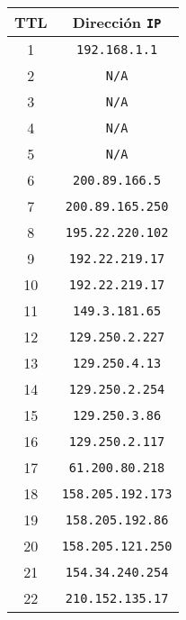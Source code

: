 \renewcommand{\arraystretch}{1.5}
\begin{tabular}{| c | c |}
    \hline
    TTL & Dirección \texttt{IP} \\
    \hline
    1 & \texttt{192.168.1.1} \\
    2 & \texttt{N/A} \\
    3 & \texttt{N/A} \\
    4 & \texttt{N/A} \\
    5 & \texttt{N/A} \\
    6 & \texttt{200.89.166.5} \\
    7 & \texttt{200.89.165.250} \\
    8 & \texttt{195.22.220.102} \\
    9 & \texttt{192.22.219.17} \\
    10 & \texttt{192.22.219.17} \\
    11 & \texttt{149.3.181.65} \\
    12 & \texttt{129.250.2.227} \\
    13 & \texttt{129.250.4.13} \\
    14 & \texttt{129.250.2.254} \\
    15 & \texttt{129.250.3.86} \\
    16 & \texttt{129.250.2.117} \\
    17 & \texttt{61.200.80.218} \\
    18 & \texttt{158.205.192.173} \\
    19 & \texttt{158.205.192.86} \\
    20 & \texttt{158.205.121.250} \\
    21 & \texttt{154.34.240.254} \\
    22 & \texttt{210.152.135.17} \\
    \hline
\end{tabular}
